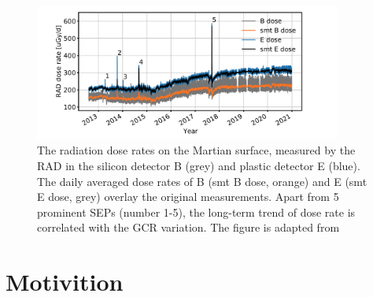 \begin{figure}
	\centering
	\includegraphics[width = 0.9\textwidth]{images/Rad_GCR_radiation.png}
	\caption{The radiation dose rates on the Martian surface, measured by the \ac{RAD} in the silicon detector B (grey) and plastic detector E (blue). The daily averaged dose rates of B (smt B dose, orange) and E (smt E dose, grey) overlay the original measurements. Apart from 5 prominent SEPs (number 1-5), the long-term trend of dose rate is correlated with the \ac{GCR} variation. The figure is adapted from \citep{Guo2021AARv_rad}}
	\label{Fig:Rad_GCR_radiation}
\end{figure}



\section{Motivition}

